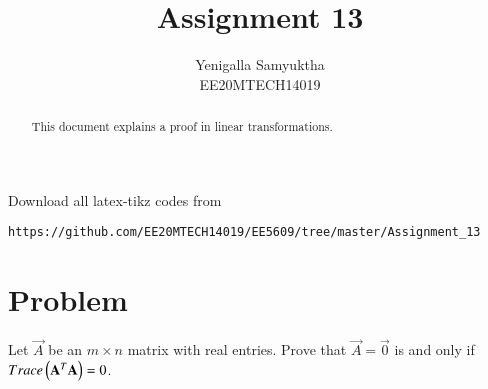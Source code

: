 \documentclass[journal,12pt,twocolumn]{IEEEtran}
\numberwithin{table}{section}
\begin{document}
     \def\rightbox#1{\makebox[0in][r]{#1}}
     \def\centbox#1{\makebox[0in]{#1}}
     \def\topbox#1{\raisebox{-\baselineskip}[0in][0in]{#1}}
     \def\midbox#1{\raisebox{-0.5\baselineskip}[0in][0in]{#1}}
\vspace{3cm}
\title{Assignment 13}
\author{Yenigalla Samyuktha\\EE20MTECH14019}
\maketitle
\newpage
\bigskip
\renewcommand{\thefigure}{\theenumi}
\renewcommand{\thetable}{\theenumi}
\begin{abstract}
This document explains a proof in linear transformations.
\end{abstract}
Download all latex-tikz codes from 
%
\begin{lstlisting}
https://github.com/EE20MTECH14019/EE5609/tree/master/Assignment_13
\end{lstlisting}
%
\section{Problem}
Let $\vec{A}$ be an $m\times n$ matrix with real entries. Prove that $\vec{A}=\vec{0}$ is and only if $Trace\left(\mathbf{A}^T\mathbf{A}\right)=0$.
\end{document}
